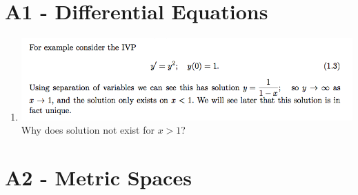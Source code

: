 \documentclass[12pt]{article}
\begin{document}
\section{A1 - Differential Equations}

\begin{enumerate}
\item \includegraphics[width=400pt]{img/questions-differential-equations-a1-warning.png}\\
  Why does solution not exist for $x > 1$?
\end{enumerate}

\section*{A2 - Metric Spaces}
\end{document}
